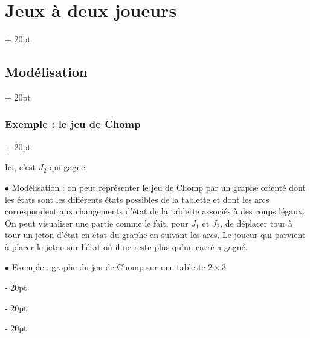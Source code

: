 \documentclass[a4paper, 12pt, twoside]{article}
\newcommand{\ind}[1][20pt]{\advance\leftskip + #1}
\newcommand{\deind}[1][20pt]{\advance\leftskip - #1}
\newenvironment{indt}[2][20pt]{#2 \par \ind[#1]}{\par \deind} %
\begin{document}
\begin{indt}{\section{Jeux à deux joueurs}}
\begin{indt}{\subsection{Modélisation}}
\begin{indt}{\subsubsection{Exemple : le jeu de Chomp}}
\begin{center}
                \end{center}

                Ici, c'est $J_2$ qui gagne.

                \vspace{12pt}
                
                $\bullet$ Modélisation : on peut représenter le jeu de Chomp par un graphe orienté dont les états sont les différents états possibles de la tablette et dont les arcs correspondent aux changements d'état de la tablette associés à des coups légaux. On peut visualiser une partie comme le fait, pour $J_1$ et $J_2$, de déplacer tour à tour un jeton d'état en état du graphe en suivant les arcs.
                Le joueur qui parvient à placer le jeton sur l'état où il ne reste plus qu'un carré a gagné.

                \vspace{12pt}
                
                $\bullet$ Exemple : graphe du jeu de Chomp sur une tablette $2 \times 3$


\end{indt}
\end{indt}
\end{indt}
\end{document}
